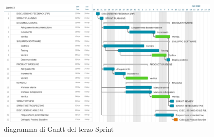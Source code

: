 \begin{figure}[htbp]
	\centering
	\includegraphics[width=15cm,keepaspectratio]{../includes/pics/grafici/Sprint_3.jpeg}
	\caption{\label{fig:gantt-sprint3}diagramma di Gantt del terzo Sprint}
\end{figure}

\clearpage
